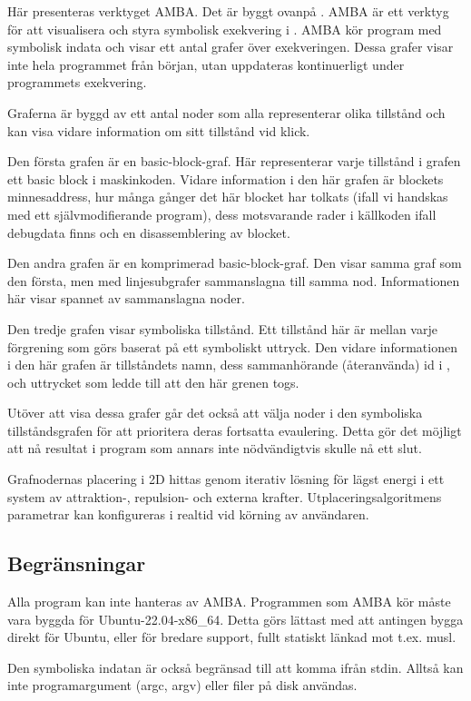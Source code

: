 Här presenteras verktyget AMBA. Det är byggt ovanpå \stoe. AMBA är ett
verktyg för att visualisera och styra symbolisk exekvering i \stoe.
AMBA kör program med symbolisk indata och visar ett antal grafer över
exekveringen. Dessa grafer visar inte hela programmet från början,
utan uppdateras kontinuerligt under programmets exekvering.

Graferna är byggd av ett antal noder som alla representerar olika
tillstånd och kan visa vidare information om sitt tillstånd vid klick.

Den första grafen är en basic-block-graf. Här representerar varje
tillstånd i grafen ett basic block i maskinkoden. Vidare information i
den här grafen är blockets minnesaddress, hur många gånger det här
blocket har tolkats (ifall vi handskas med ett självmodifierande
program), dess motsvarande rader i källkoden ifall debugdata finns och
en disassemblering av blocket.

Den andra grafen är en komprimerad basic-block-graf. Den visar samma
graf som den första, men med linjesubgrafer sammanslagna till samma
nod. Informationen här visar spannet av sammanslagna noder.

Den tredje grafen visar symboliska tillstånd. Ett tillstånd här är
mellan varje förgrening som görs baserat på ett symboliskt
uttryck. Den vidare informationen i den här grafen är tillståndets
namn, dess sammanhörande (återanvända) id i \stoe, och uttrycket som
ledde till att den här grenen togs.

Utöver att visa dessa grafer går det också att välja noder i den
symboliska tillståndsgrafen för att prioritera deras fortsatta
evaulering. Detta gör det möjligt att nå resultat i program som annars
inte nödvändigtvis skulle nå ett slut.

Grafnodernas placering i 2D hittas genom iterativ lösning för lägst
energi i ett system av attraktion-, repulsion- och externa
krafter. Utplaceringsalgoritmens parametrar kan konfigureras i realtid
vid körning av användaren.

\subsection{Begränsningar}

Alla program kan inte hanteras av AMBA. Programmen som AMBA kör måste
vara byggda för Ubuntu-22.04-x86\_64. Detta görs lättast med att
antingen bygga direkt för Ubuntu, eller för bredare support, fullt
statiskt länkad mot t.ex. musl.

Den symboliska indatan är också begränsad till att komma ifrån
stdin. Alltså kan inte programargument (argc, argv) eller filer på
disk användas.
